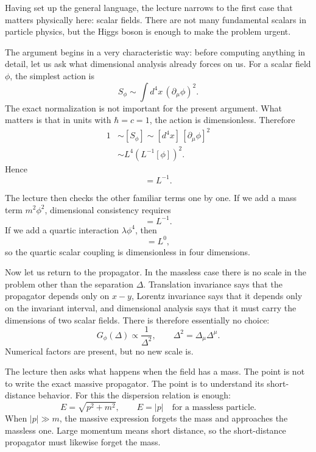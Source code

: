 Having set up the general language, the lecture narrows to the first case that matters physically here: scalar fields. There are not many fundamental scalars in particle physics, but the Higgs boson is enough to make the problem urgent.

The argument begins in a very characteristic way: before computing anything in detail, let us ask what dimensional analysis already forces on us. For a scalar field \(\phi\), the simplest action is
\begin{equation}
S_\phi \sim \int d^4x\, (\partial_\mu \phi)^2 .
\end{equation}
The exact normalization is not important for the present argument. What matters is that in units with \(\hbar=c=1\), the action is dimensionless. Therefore
\begin{align}
1 &\sim [S_\phi]
   \sim [d^4x]\,[\partial_\mu\phi]^2 \\
  &\sim L^4 \left(L^{-1}[\phi]\right)^2 .
\end{align}
Hence
\begin{equation}
[\phi]=L^{-1}.
\end{equation}

The lecture then checks the other familiar terms one by one. If we add a mass term \(m^2\phi^2\), dimensional consistency requires
\begin{equation}
[m]=L^{-1}.
\end{equation}
If we add a quartic interaction \(\lambda \phi^4\), then
\begin{equation}
[\lambda]=L^0,
\end{equation}
so the quartic scalar coupling is dimensionless in four dimensions.

Now let us return to the propagator. In the massless case there is no scale in the problem other than the separation \(\Delta\). Translation invariance says that the propagator depends only on \(x-y\), Lorentz invariance says that it depends only on the invariant interval, and dimensional analysis says that it must carry the dimensions of two scalar fields. There is therefore essentially no choice:
\begin{equation}
G_\phi(\Delta)\propto \frac{1}{\Delta^2},
\qquad
\Delta^2=\Delta_\mu\Delta^\mu .
\end{equation}
Numerical factors are present, but no new scale is.

The lecture then asks what happens when the field has a mass. The point is not to write the exact massive propagator. The point is to understand its short-distance behavior. For this the dispersion relation is enough:
\begin{equation}
E=\sqrt{p^2+m^2},
\qquad
E=|p|
\quad \text{for a massless particle.}
\end{equation}
When \(|p|\gg m\), the massive expression forgets the mass and approaches the massless one. Large momentum means short distance, so the short-distance propagator must likewise forget the mass.

